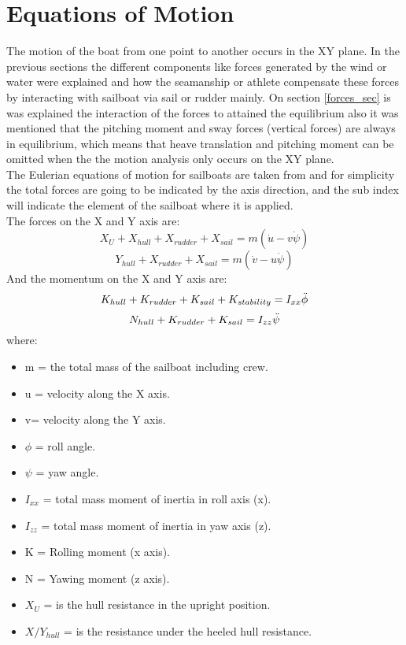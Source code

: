 \section{Equations of Motion}
The motion of the boat from one point to another occurs in the XY plane. In the previous sections the different components like forces generated by the wind or water were explained and how the seamanship or athlete compensate these forces by interacting with sailboat via sail or rudder mainly. On section \ref{forces_sec} is was explained the interaction of the forces to attained the equilibrium also it was mentioned that the  pitching moment and sway forces (vertical forces) are always in equilibrium, which means that heave translation  and pitching moment can be omitted when the the motion analysis only occurs on the XY plane. \\
The Eulerian equations of motion for sailboats are taken from \cite{de2004mathematical} and for simplicity the total forces are going to be indicated by the axis direction, and the sub index will indicate the element of the sailboat where it is applied.\\
The forces on the X and Y axis are:
\begin{equation}\label{eq:force_X_motion}
    X_{U}+X_{hull}+X_{rudder}+X_{sail}=m(\Dot{u}-v\Dot{\psi})
\end{equation}
\begin{equation}\label{eq:force_Y_motion}
    Y_{hull}+X_{rudder}+X_{sail}=m(\Dot{v}-u\Dot{\psi})
\end{equation}
And the momentum on the X and Y axis are:
\begin{equation}\label{eq:moment_X_motion}
    K_{hull}+K_{rudder}+K_{sail}+K_{stability}=I_{xx} \Ddot{\phi}
\end{equation}
\begin{equation}\label{eq:moment_Y_motion}
    N_{hull}+K_{rudder}+K_{sail}=I_{zz} \Ddot{\psi}
\end{equation}
where: 
\begin{itemize}  \label{symbols o motions}
 \setlength \itemsep{0em}
\item m = the total mass of the sailboat including crew.
\item u = velocity along the X axis.
\item v= velocity along the Y axis.
\item $\phi$ = roll angle.
\item $\psi$ = yaw angle.
\item $I_{xx}$ = total mass moment of inertia in roll axis (x).
\item $I_{zz}$ = total mass moment of inertia in yaw axis (z).
\item K = Rolling moment (x axis).
\item N = Yawing moment (z axis).
\item $X_{U}$ = is the hull resistance in the upright position.
\item $X/Y_{hull}$ = is the resistance under the heeled hull resistance.
\end{itemize}
